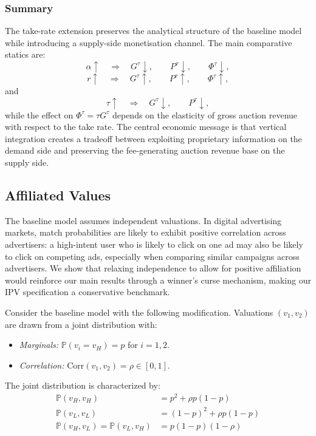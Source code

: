\documentclass[11pt]{article}
\theoremstyle{plain}
\theoremstyle{definition}
\theoremstyle{plain}
\theoremstyle{plain}
\theoremstyle{plain}
\theoremstyle{plain}
\numberwithin{equation}{section}
\begin{document}
\subsubsection{Summary}

The take-rate extension preserves the analytical structure of the baseline model while introducing
a supply-side monetisation channel. The main comparative statics are:
\[
\alpha\uparrow
\quad\Longrightarrow\quad
G^\tau\downarrow,\qquad
P^\tau\downarrow,\qquad
\Phi^\tau\downarrow,
\]
\[
r\uparrow
\quad\Longrightarrow\quad
G^\tau\uparrow,\qquad
P^\tau\uparrow,\qquad
\Phi^\tau\uparrow,
\]
and
\[
\tau\uparrow
\quad\Longrightarrow\quad
G^\tau\downarrow,\qquad
P^\tau\downarrow,
\]
while the effect on $\Phi^\tau=\tau G^\tau$ depends on the elasticity of gross auction revenue
with respect to the take rate. The central economic message is that vertical integration creates a
tradeoff between exploiting proprietary information on the demand side and preserving the
fee-generating auction revenue base on the supply side.

\vspace{4mm} 
\subsection{Affiliated Values}\label{sect:affiliated-values}

The baseline model assumes independent valuations. In digital advertising markets, match probabilities are likely to exhibit positive correlation across advertisers: a high-intent user who is likely to click on one ad may also be likely to click on competing ads, especially when comparing similar campaigns across advertisers. We show that relaxing independence to allow for positive affiliation would reinforce our main results through a winner's curse mechanism, making our IPV specification a conservative benchmark.

\vspace{0.3cm}

\noindent Consider the baseline model with the following modification. Valuations $(v_1, v_2)$ are drawn from a joint distribution with:
\begin{itemize}
    \item \emph{Marginals:} $\mathbb{P}(v_i = v_H) = p$ for $i = 1, 2$.
    \item \emph{Correlation:} $\text{Corr}(v_1, v_2) = \rho \in [0, 1]$.
\end{itemize}

\noindent The joint distribution is characterized by:
\begin{align*}
    \mathbb{P}(v_H, v_H) &= p^2 + \rho p(1-p) \\
    \mathbb{P}(v_L, v_L) &= (1-p)^2 + \rho p(1-p) \\
    \mathbb{P}(v_H, v_L) = \mathbb{P}(v_L, v_H) &= p(1-p)(1 - \rho)
\end{align*}
\end{document}
